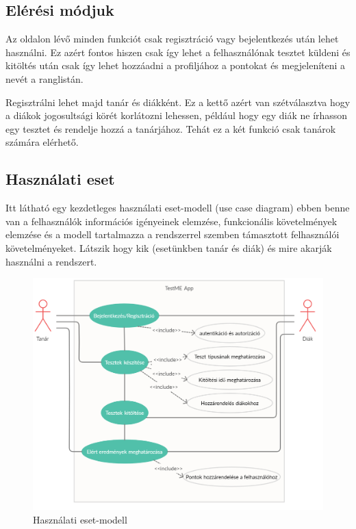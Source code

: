 \subsection{Elérési módjuk}

Az oldalon lévő minden funkciót csak regisztráció vagy bejelentkezés után lehet használni. Ez azért fontos hiszen csak így lehet a felhasználónak tesztet küldeni és kitöltés után csak így lehet hozzáadni a profiljához a pontokat és megjeleníteni a nevét a ranglistán.

\vspace{5mm}

\noindent Regisztrálni lehet majd tanár és diákként. Ez a kettő azért van szétválasztva hogy a diákok jogosultsági körét korlátozni lehessen, például hogy egy diák ne írhasson egy tesztet és rendelje hozzá a tanárjához. Tehát ez a két funkció csak tanárok számára elérhető.

\subsection{Használati eset}

Itt látható egy kezdetleges használati eset-modell (use case diagram) ebben benne van a felhasználók információs igényeinek elemzése, funkcionális követelmények elemzése és a modell tartalmazza a rendszerrel szemben támasztott felhasználói követelményeket.
Látszik hogy kik (esetünkben tanár és diák) és mire akarják használni a rendszert.

\begin{figure}[h]
    \centering
    \includegraphics[width=12cm]{images/use_case.png}
    \caption{Használati eset-modell}
\end{figure}
